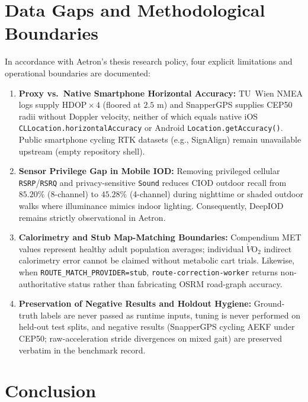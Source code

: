 \documentclass[journal]{IEEEtran}
\begin{document}
\section{Data Gaps and Methodological Boundaries}

In accordance with Aetron's thesis research policy, four explicit limitations and operational boundaries are documented:
\begin{enumerate}
  \item \textbf{Proxy vs.\ Native Smartphone Horizontal Accuracy:} TU~Wien NMEA logs supply $\mathrm{HDOP}\times 4$ (floored at $2.5\text{ m}$) and SnapperGPS supplies CEP50 radii without Doppler velocity, neither of which equals native iOS \texttt{CLLocation.horizontalAccuracy} or Android \texttt{Location.getAccuracy()}. Public smartphone cycling RTK datasets (e.g., SignAlign) remain unavailable upstream (empty repository shell).
  \item \textbf{Sensor Privilege Gap in Mobile IOD:} Removing privileged cellular \texttt{RSRP}/\texttt{RSRQ} and privacy-sensitive \texttt{Sound} reduces CIOD outdoor recall from $85.20\%$ (8-channel) to $45.28\%$ (4-channel) during nighttime or shaded outdoor walks where illuminance mimics indoor lighting. Consequently, DeepIOD remains strictly observational in Aetron.
  \item \textbf{Calorimetry and Stub Map-Matching Boundaries:} Compendium MET values \cite{herrmann2024compendium} represent healthy adult population averages; individual $\dot{V}\text{O}_2$ indirect calorimetry error cannot be claimed without metabolic cart trials. Likewise, when \texttt{ROUTE\_MATCH\_PROVIDER=stub}, \texttt{route-correction-worker} returns non-authoritative status rather than fabricating OSRM road-graph accuracy.
  \item \textbf{Preservation of Negative Results and Holdout Hygiene:} Ground-truth labels are never passed as runtime inputs, tuning is never performed on held-out test splits, and negative results (SnapperGPS cycling AEKF under CEP50; raw-acceleration stride divergences on mixed gait) are preserved verbatim in the benchmark record.
\end{enumerate}

\section{Conclusion}
\end{document}
